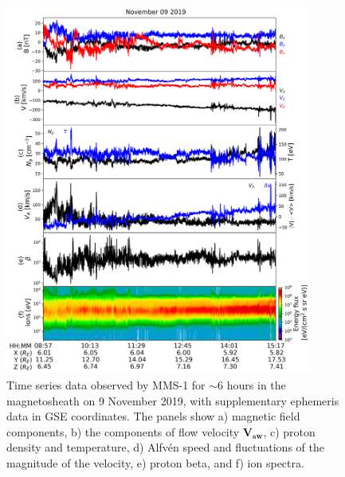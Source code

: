 \begin{figure}
    \centering
    \includegraphics[width=0.9\textwidth]{Figures/Time series/timeseries_09112019_MMS1.png}
    \caption[Time series data observed in the magnetosheath on 9 November 2019]{Time series data observed by MMS-1 for $\sim$6 hours in the magnetosheath on 9 November 2019, with supplementary ephemeris data in GSE coordinates. The panels show a) magnetic field components, b) the components of flow velocity $\mathbf{V_{sw}}$, c) proton density and temperature, d) Alfv\'en speed and fluctuations of the magnitude of the velocity, e) proton beta, and f) ion spectra.}
    \label{fig:timeseries-MMS-magnetosheath}
\end{figure}

